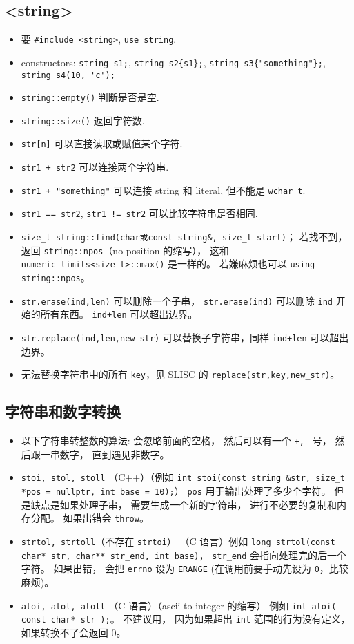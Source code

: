 \subsection{<string>}
\begin{itemize}
\item 要 \verb`#include <string>`, \verb`use string`.
\item constructors: \verb`string s1;`, \verb`string s2{s1};`, \verb`string s3{"something"};`, \verb`string s4(10, 'c');`
\item \verb`string::empty()` 判断是否是空.
\item \verb`string::size()` 返回字符数.
\item \verb`str[n]` 可以直接读取或赋值某个字符.
\item \verb`str1 + str2` 可以连接两个字符串.
\item \verb`str1 + "something"` 可以连接 string 和 literal, 但不能是 \verb`wchar_t`.
\item \verb`str1 == str2`, \verb`str1 != str2` 可以比较字符串是否相同.
\item \verb|size_t string::find(char或const string&, size_t start)|； 若找不到， 返回 \verb|string::npos|（no position 的缩写）， 这和 \verb|numeric_limits<size_t>::max()| 是一样的。 若嫌麻烦也可以 \verb|using string::npos|。
\item \verb|str.erase(ind,len)| 可以删除一个子串， \verb|str.erase(ind)| 可以删除 \verb|ind| 开始的所有东西。 \verb|ind+len| 可以超出边界。
\item \verb|str.replace(ind,len,new_str)| 可以替换子字符串，同样 \verb|ind+len| 可以超出边界。
\item 无法替换字符串中的所有 \verb|key|，见 SLISC 的 \verb|replace(str,key,new_str)|。
\end{itemize}

\subsection{字符串和数字转换}
\begin{itemize}
\item 以下字符串转整数的算法: 会忽略前面的空格， 然后可以有一个 \verb|+,-| 号， 然后跟一串数字， 直到遇见非数字。
\item \verb|stoi, stol, stoll| （C++）（例如 \verb|int stoi(const string &str, size_t *pos = nullptr, int base = 10);|） \verb|pos| 用于输出处理了多少个字符。 但是缺点是如果处理子串， 需要生成一个新的字符串， 进行不必要的复制和内存分配。 如果出错会 \verb|throw|。
\item \verb|strtol, strtoll|（不存在 \verb|strtoi|） （C 语言）例如 \verb|long strtol(const char* str, char** str_end, int base)|， \verb|str_end| 会指向处理完的后一个字符。 如果出错， 会把 \verb|errno| 设为 \verb|ERANGE| (在调用前要手动先设为 \verb|0|，比较麻烦)。
\item \verb|atoi, atol, atoll| （C 语言）（ascii to integer 的缩写） 例如 \verb|int atoi( const char* str );|。 不建议用， 因为如果超出 \verb|int| 范围的行为没有定义， 如果转换不了会返回 0。
\end{itemize}


